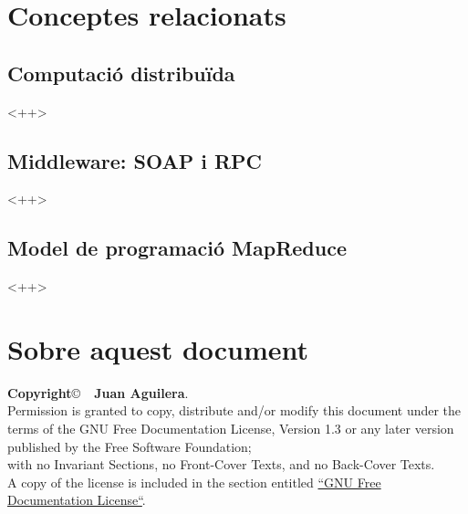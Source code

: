 \documentclass[a4paper]{article}
\begin{document}
\section{Conceptes relacionats}

\subsection{Computació distribuïda}<++>


\subsection{Middleware: SOAP i RPC}<++>

\subsection{Model de programació MapReduce}<++>

\section{Sobre aquest document}
\textbf{Copyright}\copyright\ \textbf{\the\year\ Juan Aguilera}.\\
Permission is granted to copy, distribute and/or modify this document under the terms of the GNU Free Documentation License, Version 1.3 or any later version published by the Free Software Foundation;\\
with no Invariant Sections, no Front-Cover Texts, and no Back-Cover Texts.\\
A copy of the license is included in the section entitled \href{http://www.gnu.org/licenses/fdl.html}{``GNU Free Documentation License``}.

\begin{thebibliography}{99}
	\bibitem{<++>} 
\end{thebibliography}
\end{document}
